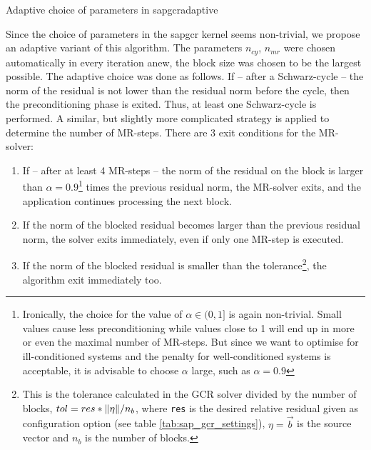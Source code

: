 \documentclass{article}
\theoremstyle{plain} %
\theoremstyle{convention} %
\theoremstyle{remark} %
\def\code#1{\texttt{#1}}
\numberwithin{equation}{section}
\begin{document}
\begin{proposal}{Adaptive choice of parameters in \acrshort{sapgcr}}{adaptive}

Since the choice of parameters in the \acrshort{sapgcr} kernel seems non-trivial, we propose an adaptive variant of this algorithm. The parameters $n_{cy}$, $n_{mr}$ were chosen automatically in every iteration anew, the block size was chosen to be the largest possible. The adaptive choice was done as follows. If -- after a Schwarz-cycle -- the norm of the residual is not lower than the residual norm before the cycle, then the preconditioning phase is exited. Thus, at least one Schwarz-cycle is performed. A similar, but slightly more complicated strategy is applied to determine the number of MR-steps. There are \num{3} exit conditions for the MR-solver:

\begin{enumerate}[label={\arabic*)}]
  \item If -- after at least \num{4} MR-steps -- the norm of the residual on the block is larger than $\alpha = 0.9$\footnote{Ironically, the choice for the value of $\alpha \in (0, 1]$ is again non-trivial. Small values cause less preconditioning while values close to \num{1} will end up in more or even the maximal number of MR-steps. But since we want to optimise for ill-conditioned systems and the penalty for well-conditioned systems is acceptable, it is advisable to choose $\alpha$ large, such as $\alpha = 0.9$} times the previous residual norm, the MR-solver exits, and the application continues processing the next block.
  \item If the norm of the blocked residual becomes larger than the previous residual norm, the solver exits immediately, even if only one MR-step is executed.
  \item If the norm of the blocked residual is smaller than the tolerance\footnote{This is the tolerance calculated in the GCR solver divided by the number of blocks, $tol = res*\norm{\eta}/n_b$, where \code{res} is the desired relative residual given as configuration option (see table \ref{tab:sap_gcr_settings}), $\eta = \vec{b}$ is the source vector and $n_b$ is the number of blocks.}, the algorithm exit immediately too.
\end{enumerate}


\end{proposal}
\end{document}
